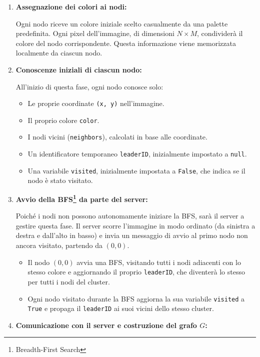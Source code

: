 \documentclass[12pt, a4paper]{report}
\begin{document}
\begin{enumerate}
    \item \textbf{Assegnazione dei colori ai nodi:}

    Ogni nodo riceve un colore iniziale scelto casualmente da una palette predefinita. Ogni pixel dell'immagine, di dimensioni $N \times M$, condivider\`a il colore del nodo corrispondente. Questa informazione viene memorizzata localmente da ciascun nodo.

    \item \textbf{Conoscenze iniziali di ciascun nodo:}

    All'inizio di questa fase, ogni nodo conosce solo:
    \begin{itemize}
        \item Le proprie coordinate \texttt{(x, y)} nell'immagine.
        \item Il proprio colore \texttt{color}.
        \item I nodi vicini (\texttt{neighbors}), calcolati in base alle coordinate.
        \item Un identificatore temporaneo \texttt{leaderID}, inizialmente impostato a \texttt{null}.
        \item Una variabile \texttt{visited}, inizialmente impostata a \texttt{False}, che indica se il nodo \`e stato visitato.
    \end{itemize}

    \item \textbf{Avvio della BFS\footnote{Breadth-First Search} da parte del server:}

    Poiché i nodi non possono autonomamente iniziare la BFS, sar\`a il server a gestire questa fase. Il server scorre l'immagine in modo ordinato (da sinistra a destra e dall'alto in basso) e invia un messaggio di avvio al primo nodo non ancora visitato, partendo da $(0, 0)$.

    \begin{itemize}
        \item Il nodo $(0, 0)$ avvia una BFS, visitando tutti i nodi adiacenti con lo stesso colore e aggiornando il proprio \texttt{leaderID}, che diventer\`a lo stesso per tutti i nodi del cluster.
        \item Ogni nodo visitato durante la BFS aggiorna la sua variabile \texttt{visited} a \texttt{True} e propaga il \texttt{leaderID} ai suoi vicini dello stesso cluster.
    \end{itemize}

    \item \textbf{Comunicazione con il server e costruzione del grafo $G$:}


\end{enumerate}
\end{document}
